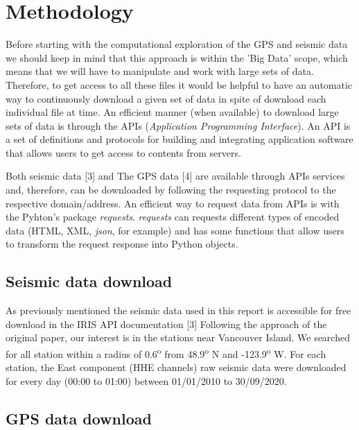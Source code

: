 \documentclass{article}
\begin{document}

\section{Methodology}

Before starting with the computational exploration of the GPS and seismic data we should keep in mind that this approach is within the 'Big Data' scope, which means that we will have to manipulate and work with large sets of data. Therefore, to get access to all these files it would be helpful to have an automatic way to continuously download a given set of data in spite of download each individual file at time. An efficient manner (when available) to download large sets of data is through the APIs (\textit{Application Programming Interface}). An API is a set of definitions and protocols for building and integrating application software that allows users to get access to contents from servers.

Both seismic data [3] and The GPS data [4] are available through APIs services and, therefore, can be downloaded by following the requesting protocol to the respective domain/address. An efficient way to request data from APIs is with the Pyhton's package \textit{requests}. \textit{requests} can requests different types of encoded data (HTML, XML, \textit{json}, for example) and has some functions that allow users to transform the request response into Python objects.

\subsection{Seismic data download} \label{down}

As previously mentioned the seismic data used in this report is accessible for free download in the IRIS API documentation [3] Following the approach of the original paper, our interest is in the stations near Vancouver Island. We searched for all station within a radius of 0.6\textsuperscript{o} from 48.9\textsuperscript{o} N and -123.9\textsuperscript{o} W. For each station, the East component (HHE channels) raw seismic data were downloaded for every day (00:00 to 01:00) between 01/01/2010 to 30/09/2020. 

\subsection{GPS data download}
\end{document}
